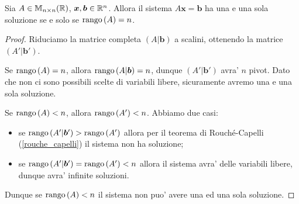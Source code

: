 \begin{proposition}
    Sia $A \in \mathbb{M}_{n \times n}(\mathbb{R})$, $\bm{x}, \bm{b} \in \mathbb{R}^n$. Allora il sistema $A\bm x = \bm b$ ha una e una sola soluzione se e solo se $\operatorname{rango}\left( A \right) = n$.
\end{proposition}
\begin{proof}
    Riduciamo la matrice completa $(A | \bm b)$ a scalini, ottenendo la matrice $(A' | \bm b')$.

    Se $\operatorname{rango}\left( A \right) = n$, allora $\operatorname{rango}\left( A | \bm b \right) = n$, dunque $(A' | \bm b')$ avra' $n$ pivot. Dato che non ci sono possibili scelte di variabili libere, sicuramente avremo una e una sola soluzione.

    Se $\operatorname{rango}\left( A \right) < n$, allora $\operatorname{rango}\left( A' \right) < n$. Abbiamo due casi: \begin{itemize}
        \item se $\operatorname{rango}\left( A' | \bm b' \right) > \operatorname{rango}\left( A' \right)$ allora per il teorema  di Rouché-Capelli (\ref{rouche_capelli}) il sistema non ha soluzione;
        \item se $\operatorname{rango}\left( A' | \bm b' \right) = \operatorname{rango}\left( A' \right) < n$ allora il sistema avra' delle variabili libere, dunque avra' infinite soluzioni.
    \end{itemize}
    Dunque se $\operatorname{rango}\left( A \right) < n$ il sistema non puo' avere una ed una sola soluzione.
\end{proof}

